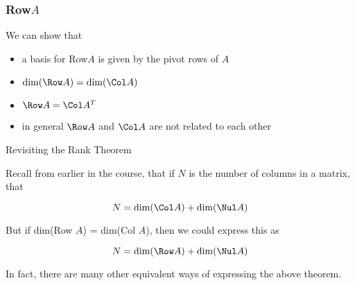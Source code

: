 \begin{frame}\frametitle{Row$A$}
    
    \begin{center}
    \end{center}

	We can show that
	\vspace{6pt}
	\begin{itemize} \setlength\itemsep{1em}
		\item<2-> a basis for Row$A$ is given by the pivot rows of $A$
		\item<3-> $\dim(\Row A) = \dim(\Col A)$
	    \item<4-> $\Row A = \Col A^T$
	    \item<5-> in general $\Row A$ and $\Col A$ are not related to each other
	\end{itemize}

\end{frame}









\begin{frame}{Revisiting the Rank Theorem}

    Recall from earlier in the course, that if $N$ is the number of columns in a matrix, that
    
    $$N = \dim (\Col A) + \dim (\Nul A)$$
    \vspace{2pt}
    \pause
    
    But if dim(Row $A$) = dim(Col $A$), then we could express this as
    
    $$N = \dim (\Row A) + \dim (\Nul A)$$
    \vspace{2pt}
    \pause
    
    In fact, there are many other equivalent ways of expressing the above theorem. 
    
\end{frame}



